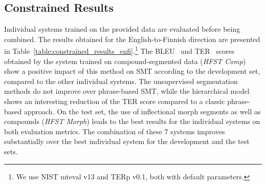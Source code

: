 \documentclass[postprint]{flammie}
\begin{document}
\subsection{Constrained Results}
\label{section:constrained_results}
%

Individual systems trained on the provided data are evaluated before being combined. The results obtained for the English-to-Finnish direction are presented in Table~\ref{table:constrained_results_enfi}.\footnote{We use NIST mteval v13 and TERp v0.1, both with default parameters.} The \textsc{BLEU}~\cite{papineni2002bleu} and \textsc{TER}~\cite{snover2006study} scores obtained by the system trained on compound-segmented data (\textit{HFST Comp}) show a positive impact of this method on SMT according to the development set, compared to the other individual systems. The unsupervised segmentation methods do not improve over phrase-based SMT, while the hierarchical model shows an interesting reduction of the \textsc{TER} score compared to a classic phrase-based approach. On the test set, the use of inflectional morph segments as well as compounds (\textit{HFST Morph}) leads to the best results for the individual systems on both evaluation metrics. The combination of these $7$ systems improves substantially over the best individual system for the development and the test sets. %

\begin{table}
\end{table}
%
\end{document}
